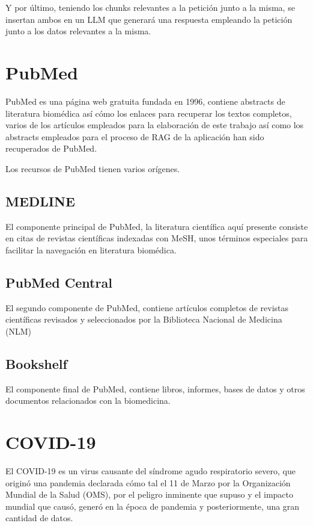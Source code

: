 Y por último, teniendo los chunks relevantes a la petición junto a la misma, se insertan ambos en un LLM que generará una respuesta empleando la petición junto a los datos relevantes a la misma.

\section{PubMed}

PubMed es una página web gratuita fundada en 1996, contiene abstracts de  literatura biomédica así cómo los enlaces para recuperar los textos completos, varios de los artículos empleados para la elaboración de este trabajo así como los abstracts empleados para el proceso de RAG de la aplicación han sido recuperados de PubMed.

Los recursos de PubMed tienen varios orígenes.

\subsection{MEDLINE}

El componente principal de PubMed, la literatura científica aquí presente consiste en citas de revistas científicas indexadas con MeSH, unos términos especiales para facilitar la navegación en literatura biomédica.

\subsection{PubMed Central}

El segundo componente de PubMed, contiene artículos completos de revistas científicas revisados y seleccionados por la Biblioteca Nacional de Medicina (NLM)
\subsection{Bookshelf}

El componente final de PubMed, contiene libros, informes, bases de datos y otros documentos relacionados con la biomedicina.

\section{COVID-19}

El COVID-19 es un virus causante del síndrome agudo respiratorio severo, que originó una pandemia declarada cómo tal el 11 de Marzo por la Organización Mundial de la Salud (OMS), por el peligro inminente que supuso y el impacto mundial que causó, generó en la época de pandemia y posteriormente, una gran cantidad de datos.